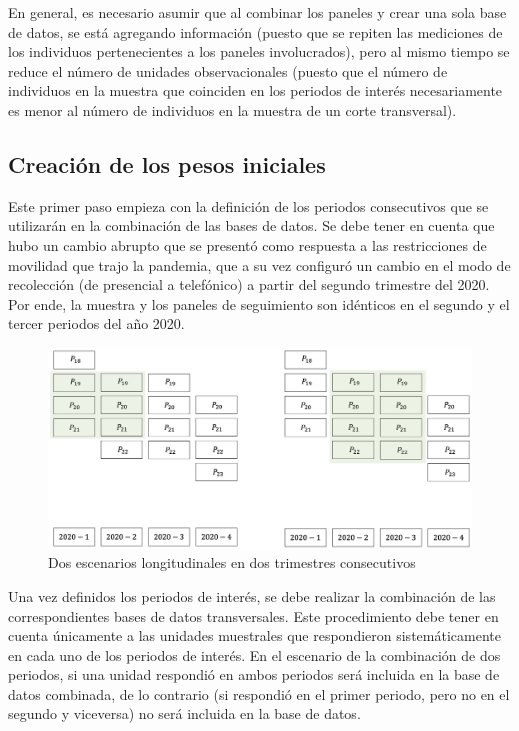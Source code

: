\documentclass[
  10pt,
  spanish,
]{book}
\begin{document}
En general, es necesario asumir que al combinar los paneles y crear una sola base de datos, se está agregando información (puesto que se repiten las mediciones de los individuos pertenecientes a los paneles involucrados), pero al mismo tiempo se reduce el número de unidades observacionales (puesto que el número de individuos en la muestra que coinciden en los periodos de interés necesariamente es menor al número de individuos en la muestra de un corte transversal).

\hypertarget{creaciuxf3n-de-los-pesos-iniciales}{%
\subsection{Creación de los pesos iniciales}\label{creaciuxf3n-de-los-pesos-iniciales}}

Este primer paso empieza con la definición de los periodos consecutivos que se utilizarán en la combinación de las bases de datos. Se debe tener en cuenta que hubo un cambio abrupto que se presentó como respuesta a las restricciones de movilidad que trajo la pandemia, que a su vez configuró un cambio en el modo de recolección (de presencial a telefónico) a partir del segundo trimestre del 2020. Por ende, la muestra y los paneles de seguimiento son idénticos en el segundo y el tercer periodos del año 2020.

\begin{figure}
\centering
\includegraphics{Pics/el2.png}
\caption{Dos escenarios longitudinales en dos trimestres consecutivos}
\end{figure}

Una vez definidos los periodos de interés, se debe realizar la combinación de las correspondientes bases de datos transversales. Este procedimiento debe tener en cuenta únicamente a las unidades muestrales que respondieron sistemáticamente en cada uno de los periodos de interés. En el escenario de la combinación de dos periodos, si una unidad respondió en ambos periodos será incluida en la base de datos combinada, de lo contrario (si respondió en el primer periodo, pero no en el segundo y viceversa) no será incluida en la base de datos.
\end{document}
